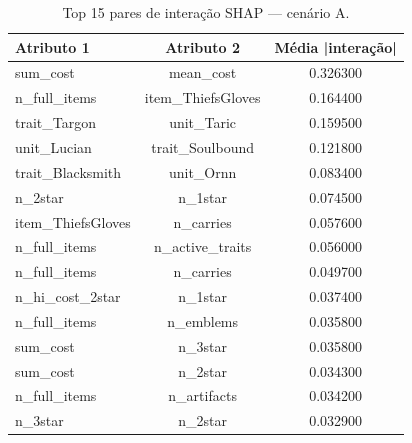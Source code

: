 \begin{table}[htbp]
\caption{Top 15 pares de interação SHAP — cenário A.}
\label{tab:intertA}
\centering
\small
\begin{tabular}{lcc}
\toprule
Atributo 1 & Atributo 2 & Média |interação| \\
\midrule
sum\_cost & mean\_cost & 0.326300 \\
n\_full\_items & item\_ThiefsGloves & 0.164400 \\
trait\_Targon & unit\_Taric & 0.159500 \\
unit\_Lucian & trait\_Soulbound & 0.121800 \\
trait\_Blacksmith & unit\_Ornn & 0.083400 \\
n\_2star & n\_1star & 0.074500 \\
item\_ThiefsGloves & n\_carries & 0.057600 \\
n\_full\_items & n\_active\_traits & 0.056000 \\
n\_full\_items & n\_carries & 0.049700 \\
n\_hi\_cost\_2star & n\_1star & 0.037400 \\
n\_full\_items & n\_emblems & 0.035800 \\
sum\_cost & n\_3star & 0.035800 \\
sum\_cost & n\_2star & 0.034300 \\
n\_full\_items & n\_artifacts & 0.034200 \\
n\_3star & n\_2star & 0.032900 \\
\bottomrule
\end{tabular}
\end{table}
